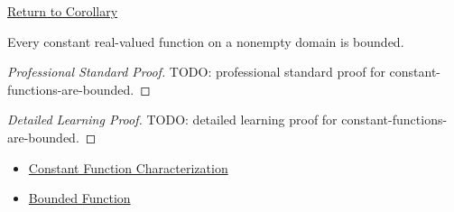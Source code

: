\newpage
{}
\label{prf:constant-functions-are-bounded}

\begin{remark*}[Return]
\hyperref[cor:constant-functions-are-bounded]{Return to Corollary}
\end{remark*}

\begin{corollary*}
Every constant real-valued function on a nonempty domain is bounded.
\end{corollary*}

\begin{proof}[Professional Standard Proof]
\LRAProofBodyStart
TODO: professional standard proof for constant-functions-are-bounded.
\end{proof}

\begin{proof}[Detailed Learning Proof]
\LRAProofBodyStart
TODO: detailed learning proof for constant-functions-are-bounded.
\end{proof}

\begin{remark*}
\end{remark*}

\begin{dependencies}
\begin{itemize}
  \item \hyperref[prop:constant-function-characterization]{Constant Function Characterization}
  \item \hyperref[def:function-bounded]{Bounded Function}
\end{itemize}
\end{dependencies}

\clearpage
